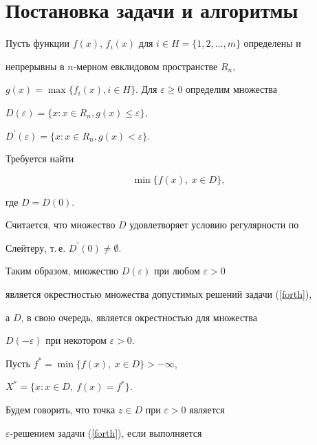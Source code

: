 \section{Постановка задачи и алгоритмы}





Пусть функции $f(x)$, $f_i(x)$ для $i\in H=\{1,2,\dotsc,m\}$ определены и


непрерывны в $n$-мерном евклидовом пространстве $R_n$,


$g(x)=\max\{f_i(x),i \in H\}$. Для $\varepsilon\ge0$ определим множества


$D(\varepsilon)=\{x:x \in R_n, g(x)\le\varepsilon\}$,


$D^\prime(\varepsilon)=\{x:x\in R_n,g(x)<\varepsilon\}$.





Требуется найти


\begin{equation}


\label{forth}


\min\{f(x),\ x\in D\},


\end{equation}


где $D=D(0)$.





Считается, что множество $D$ удовлетворяет условию регулярности по


Слейтеру, т.\,е. $D^\prime(0){\ne}\emptyset$.





Таким образом, множество $D(\varepsilon)$ при любом $\varepsilon>0$


является окрестностью множества допустимых решений задачи (\ref{forth}),


а $D$, в свою очередь, является окрестностью для множества


$D(-\varepsilon)$ при некотором $\varepsilon>0$.





Пусть $f^*=\min\{f(x),\ x\in D\}>-\infty$,


$X^*=\{x: x\in D,\ f(x)=f^*\}$.





Будем говорить, что точка $z\in D$ при $\varepsilon>0$ является


$\varepsilon$-решением задачи (\ref{forth}), если выполняется



